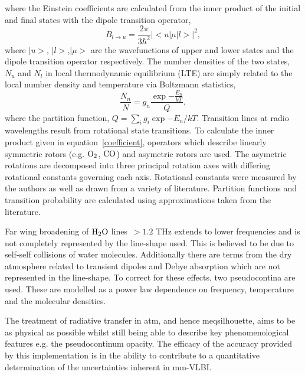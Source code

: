 \noindent where the Einstein coefficients are calculated from the inner product of the initial and final states with the dipole transition operator,\begin{equation}\label{coefficient}
B_{l \to u} = \frac{2\pi}{3\hbar^2} |<u|\mu|l>|^2,
\end{equation}
where $|u>$, $|l>$,$|\mu>$ are the wavefunctions of upper and lower states and the dipole transition operator respectively. The number densities of the two states, $N_u$ and $N_l$ in local thermodynamic equilibrium (LTE) are simply related to the local number density and temperature via Boltzmann statistics, 
\begin{equation}
\frac{N_n}{N} = g_n \frac {\exp{-\frac{E_n}{kT}}}{Q},
\end{equation}
where the partition function, $Q = \sum_i g_i  \exp{-E_n/kT}$. 
Transition lines at radio wavelengths result from rotational state transitions. To calculate the inner product given in equation~\ref{coefficient}, operators which describe linearly symmetric rotors (e.g. ${\rm O_2}$, ${\rm CO}$) and asymetric rotors are used. The asymetric rotations are decomposed into three principal rotation axes with differing rotational constants governing each axis. Rotational constants were measured by the authors as well as drawn from a variety of literature. Partition functions and transition probability are calculated using approximations taken from the literature.
 

Far wing broadening of ${\rm H_2O}$ lines~$> 1.2$ THz extends to lower frequencies and is not completely represented by the line-shape used. This is believed to be due to self-self collisions of water molecules. Additionally there are terms from the dry atmosphere related to transient dipoles and Debye absorption which are not represented in the line-shape. To correct for these effects, two pseudocontina are used. These are modelled as a power law dependence on frequency, temperature and the molecular densities. 

The treatment of radiative transfer in {\sc atm}, and hence {\sc meqsilhouette}, aims to be as physical as possible whilst still being able to describe key phenomenological features e.g. the pseudocontinum opacity. The efficacy of the accuracy provided by this implementation is in the ability to contribute to a quantitative determination of the uncertainties inherent in mm-VLBI.
